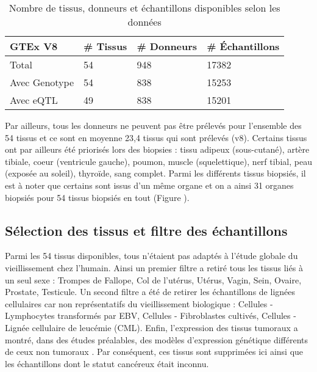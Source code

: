 \begin{table}[h]
\centering
\begin{tabular}{llll}
\textbf{GTEx V8} & \textbf{\# Tissus} & \textbf{\# Donneurs} & \textbf{\# Échantillons} \\ \hline
Total            & 54                 & 948                  & 17382                    \\
Avec Genotype    & 54                 & 838                  & 15253                    \\
Avec eQTL        & 49                 & 838                  & 15201                   
\end{tabular}
\caption{Nombre de tissus, donneurs et échantillons disponibles selon les données}
\label{table:gtex_sample_tissues_donnor}
\end{table}

Par ailleurs, tous les donneurs ne peuvent pas être prélevés pour l'ensemble des 54 tissus et ce sont en moyenne 23,4 tissus qui sont prélevés (v8). Certains tissus ont par ailleurs été priorisés lors des biopsies : tissu adipeux (sous-cutané), artère tibiale, coeur (ventricule gauche), poumon, muscle (squelettique), nerf tibial, peau (exposée au soleil), thyroïde, sang complet. Parmi les différents tissus biopsiés, il est à noter que certains sont issus d'un même organe et on a ainsi 31 organes biopsiés pour 54 tissus biopsiés en tout (Figure ).



\subsection{Sélection des tissus et filtre des échantillons}

Parmi les 54 tissus disponibles, tous n'étaient pas adaptés à l'étude globale du vieillissement chez l'humain. Ainsi un premier filtre a retiré tous les tissus liés à un seul sexe : Trompes de Fallope, Col de l'utérus, Utérus, Vagin, Sein, Ovaire, Prostate, Testicule. Un second filtre a été de retirer les échantillons de lignées cellulaires car non représentatifs du vieillissement biologique : Cellules - Lymphocytes transformés par EBV, Cellules - Fibroblastes cultivés, Cellules - Lignée cellulaire de leucémie (CML). Enfin, l'expression des tissus tumoraux a montré, dans des études préalables, des modèles d'expression génétique différents de ceux non tumoraux . Par conséquent, ces tissus sont supprimées ici ainsi que les échantillons dont le statut cancéreux 
était inconnu. 

